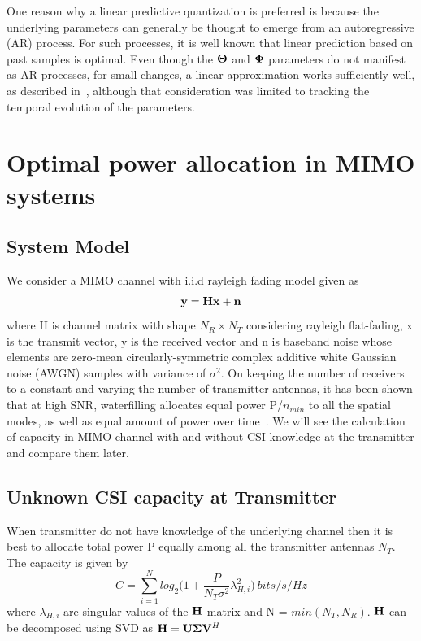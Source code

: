 \documentclass[11pt,a4paper]{report}
\def\bn{{\bf n}}
\def\bx{{\bf x}}
\def\by{{\bf y}}
\def\bSigma{{\bf \Sigma}}
\def\bH{{\bf H}}
\def\bU{{\bf U}}
\def\bV{{\bf V}}
\begin{document}
One reason why a linear predictive quantization is preferred is
because the underlying parameters can generally be thought to emerge
from an autoregressive (AR) process. For such processes, it is well
known that linear prediction based on past samples is optimal. Even
though the $\bf{\Theta}$ and $\bf{\Phi}$ parameters do not manifest as AR
processes, for small changes, a linear approximation works
sufficiently well, as described in~\cite{4114278}, although that
consideration was limited to tracking the temporal evolution of the
parameters.

\section{Optimal power allocation in MIMO systems}

\subsection{System Model}
\label{sec:1}
We consider a MIMO channel with i.i.d rayleigh fading model given as
\begin{equation}
\by = \bH\bx + \bn
\end{equation}
where H is channel matrix with shape $N_R\times N_T$ considering rayleigh flat-fading,
x is the transmit vector, y is the received vector and n is baseband
noise whose elements are zero-mean circularly-symmetric complex additive 
white Gaussian noise (AWGN) samples with variance of $\sigma^2$.
On keeping the number of receivers to a constant and varying the number of transmitter
antennas, it has been shown that at high SNR, waterfilling allocates
equal power P/$n_{min}$ to all the spatial modes, as well as equal amount
of power over time~\cite{10.5555/1111206}.
We will see the calculation of capacity in MIMO channel with and without
CSI knowledge at the transmitter and compare them later.

\subsection{Unknown CSI capacity at Transmitter}
When transmitter do not have knowledge of the underlying channel
then it is best to allocate total power P equally among all the 
transmitter antennas $N_T$. The capacity is given by~\cite{Foschini1998, Khalighi2002, 6770094} 
\begin{equation}
C = \sum_{i=1}^{N}log_{2}\big(1 + \frac{P}{N_{T}\sigma^2}\lambda^{2}_{H,i}\big)\: bits/s/Hz
\end{equation}
where $\lambda_{H,i}$ are singular values of the $\bH$ matrix and N = $min(N_T, N_R)$.
$\bH$ can be decomposed using SVD as $\bH = \bU\bSigma\bV^H$
\end{document}
